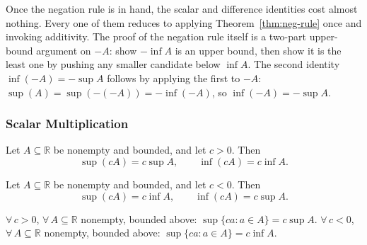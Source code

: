 \begin{remark*}
Once the negation rule is in hand, the scalar and difference identities
cost almost nothing.
Every one of them reduces to applying
Theorem~\ref{thm:neg-rule} once and invoking additivity.
The proof of the negation rule itself is a two-part upper-bound argument
on $-A$: show $-\inf A$ is an upper bound, then show it is the least one
by pushing any smaller candidate below $\inf A$.
The second identity $\inf(-A) = -\sup A$ follows by applying the first
to $-A$:
$\sup(A) = \sup(-(-A)) = -\inf(-A)$, so $\inf(-A) = -\sup A$.
\end{remark*}

\subsubsection{Scalar Multiplication}

\begin{theorem}
\label{thm:scale-pos}
Let $A \subseteq \mathbb{R}$ be nonempty and bounded, and let $c > 0$. Then
\[
\sup(cA) = c\sup A, \qquad \inf(cA) = c\inf A.
\]
\end{theorem}

\begin{theorem}
\label{thm:scale-neg}
Let $A \subseteq \mathbb{R}$ be nonempty and bounded, and let $c < 0$. Then
\[
\sup(cA) = c\inf A, \qquad \inf(cA) = c\sup A.
\]
\end{theorem}

\begin{remark*}
$\forall\, c > 0$, $\forall\, A \subseteq \mathbb{R}$ nonempty, bounded above:
$\sup\{ca : a \in A\} = c\sup A$.
$\forall\, c < 0$, $\forall\, A \subseteq \mathbb{R}$ nonempty, bounded above:
$\sup\{ca : a \in A\} = c\inf A$.
\end{remark*}

